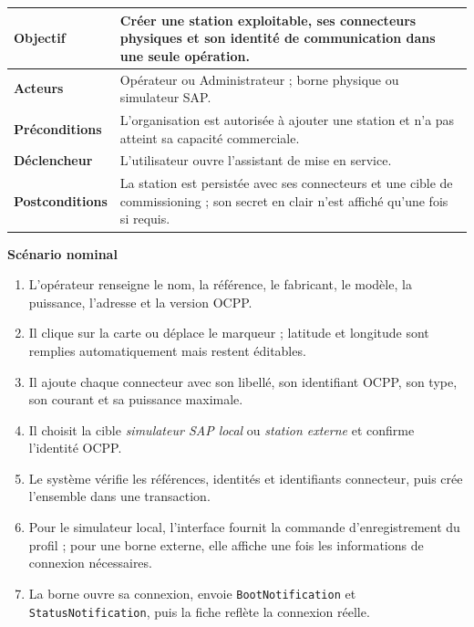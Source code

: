\begin{table}[H]
  \centering
  \begin{tabularx}{\textwidth}{|C{3.3cm}|Y|}
    \hline
    \textbf{Objectif} & Créer une station exploitable, ses connecteurs physiques et
    son identité de communication dans une seule opération.\\\hline
    \textbf{Acteurs} & Opérateur ou Administrateur ; borne physique ou simulateur SAP.\\\hline
    \textbf{Préconditions} & L'organisation est autorisée à ajouter une station et
    n'a pas atteint sa capacité commerciale.\\\hline
    \textbf{Déclencheur} & L'utilisateur ouvre l'assistant de mise en service.\\\hline
    \textbf{Postconditions} & La station est persistée avec ses connecteurs et une
    cible de commissioning ; son secret en clair n'est affiché qu'une fois si requis.\\\hline

  \end{tabularx}
\end{table}

\textbf{Scénario nominal}
\begin{enumerate}[leftmargin=8mm]
  \item L'opérateur renseigne le nom, la référence, le fabricant, le modèle, la
  puissance, l'adresse et la version OCPP.
  \item Il clique sur la carte ou déplace le marqueur ; latitude et longitude sont
  remplies automatiquement mais restent éditables.
  \item Il ajoute chaque connecteur avec son libellé, son identifiant OCPP, son type,
  son courant et sa puissance maximale.
  \item Il choisit la cible \emph{simulateur SAP local} ou \emph{station externe} et
  confirme l'identité OCPP.
  \item Le système vérifie les références, identités et identifiants connecteur, puis
  crée l'ensemble dans une transaction.
  \item Pour le simulateur local, l'interface fournit la commande d'enregistrement du
  profil ; pour une borne externe, elle affiche une fois les informations de
  connexion nécessaires.
  \item La borne ouvre sa connexion, envoie \texttt{BootNotification} et
  \texttt{StatusNotification}, puis la fiche reflète la connexion réelle.
\end{enumerate}

